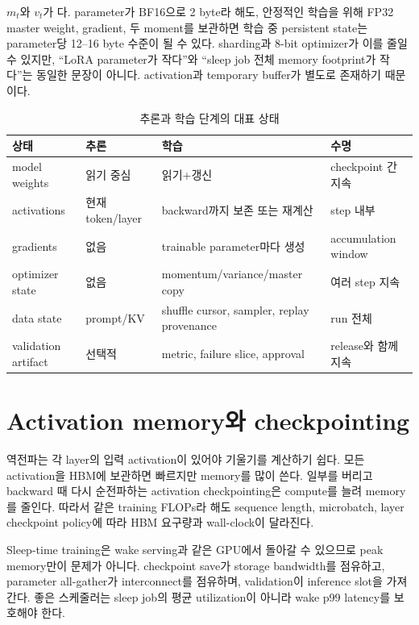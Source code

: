 $m_t$와 $v_t$가 다. parameter가 BF16으로
2 byte라 해도, 안정적인 학습을 위해 FP32 master weight, gradient, 두 moment를 보관하면
학습 중 persistent state는 parameter당 12--16 byte 수준이 될 수 있다. sharding과
8-bit optimizer가 이를 줄일 수 있지만, ``LoRA parameter가 작다''와 ``sleep job 전체
memory footprint가 작다''는 동일한 문장이 아니다. activation과 temporary buffer가 별도로
존재하기 때문이다.

\begin{table}[htbp]
\centering
\caption{추론과 학습 단계의 대표 상태}
\label{tab:bg-training-state}
\begin{tabularx}{\textwidth}{L{0.21\textwidth}YYY}
\toprule
상태 & 추론 & 학습 & 수명 \\
\midrule
model weights & 읽기 중심 & 읽기+갱신 & checkpoint 간 지속 \\
activations & 현재 token/layer & backward까지 보존 또는 재계산 & step 내부 \\
gradients & 없음 & trainable parameter마다 생성 & accumulation window \\
optimizer state & 없음 & momentum/variance/master copy & 여러 step 지속 \\
data state & prompt/KV & shuffle cursor, sampler, replay provenance & run 전체 \\
validation artifact & 선택적 & metric, failure slice, approval & release와 함께 지속 \\
\bottomrule
\end{tabularx}
\end{table}

\section{Activation memory와 checkpointing}

역전파는 각 layer의 입력 activation이 있어야 기울기를 계산하기 쉽다. 모든 activation을
HBM에 보관하면 빠르지만 memory를 많이 쓴다. 일부를 버리고 backward 때 다시 순전파하는
activation checkpointing은 compute를 늘려 memory를 줄인다. 따라서 같은 training FLOPs라
해도 sequence length, microbatch, layer checkpoint policy에 따라 HBM 요구량과 wall-clock이
달라진다.

Sleep-time training은 wake serving과 같은 GPU에서 돌아갈 수 있으므로 peak memory만이
문제가 아니다. checkpoint save가 storage bandwidth를 점유하고, parameter all-gather가
interconnect를 점유하며, validation이 inference slot을 가져간다. 좋은 스케줄러는 sleep job의
평균 utilization이 아니라 wake p99 latency를 보호해야 한다.

